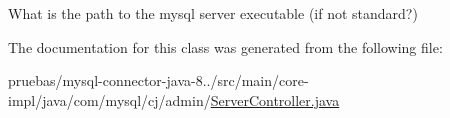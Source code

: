 What is the path to the mysql server executable (if not standard?) 

The documentation for this class was generated from the following file\+:\begin{DoxyCompactItemize}
\item 
pruebas/mysql-\/connector-\/java-\/8../src/main/core-\/impl/java/com/mysql/cj/admin/\mbox{\hyperlink{_server_controller_8java}{Server\+Controller.\+java}}\end{DoxyCompactItemize}
